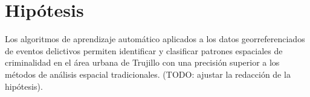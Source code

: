 
\section{Hipótesis}

\label{sec:hipotesis}

Los algoritmos de aprendizaje automático aplicados a los datos georreferenciados
de eventos delictivos permiten identificar y clasificar patrones espaciales
de criminalidad en el área urbana de Trujillo con una precisión superior
a los métodos de análisis espacial tradicionales. (TODO: ajustar la
redacción de la hipótesis).
